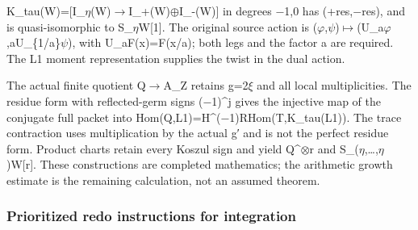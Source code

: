 K\_tau(W)=[I\_\allowbreak{}\ensuremath{η}\allowbreak{}(W)\allowbreak{}\ensuremath{→}\allowbreak{}I\_+(W)\allowbreak{}\ensuremath{⊕}\allowbreak{}I\_-(W)]
in degrees \allowbreak{}\ensuremath{−}\allowbreak{}1,0 has
(+res,\allowbreak{}\ensuremath{−}\allowbreak{}res), and is
quasi-isomorphic to S\_\allowbreak{}\ensuremath{η}\allowbreak{}W[1]. The
original source action is
(\allowbreak{}\ensuremath{φ}\allowbreak{},\allowbreak{}\ensuremath{ψ}\allowbreak{})\allowbreak{}\ensuremath{↦}\allowbreak{}(U\_a\allowbreak{}\ensuremath{φ}\allowbreak{},aU\_\{1/a\}\allowbreak{}\ensuremath{ψ}\allowbreak{}),
with U\_aF(x)=F(x/a); both legs and the factor a are required. The L1
moment representation supplies the twist in the dual action.

The actual finite quotient Q\allowbreak{}\ensuremath{→}\allowbreak{}A\_Z
retains g=2\allowbreak{}\ensuremath{ξ}\allowbreak{} and all local
multiplicities. The residue form with reflected-germ signs
(\allowbreak{}\ensuremath{−}\allowbreak{}1)\textasciicircum{}j gives the
injective map of the conjugate full packet into
Hom(Q,L1)=H\textasciicircum{}(\allowbreak{}\ensuremath{−}\allowbreak{}1)RHom(T,K\_tau(L1)).
The trace contraction uses multiplication by the actual g′ and is not
the perfect residue form. Product charts retain every Koszul sign and
yield Q\textasciicircum{}\allowbreak{}\ensuremath{⊗}\allowbreak{}r and
S\_(\allowbreak{}\ensuremath{η}\allowbreak{},…,\allowbreak{}\ensuremath{η}\allowbreak{})W[r].
These constructions are completed mathematics; the arithmetic growth
estimate is the remaining calculation, not an assumed theorem.

\subsubsection{Prioritized redo instructions for
integration}\label{prioritized-redo-instructions-for-integration}

